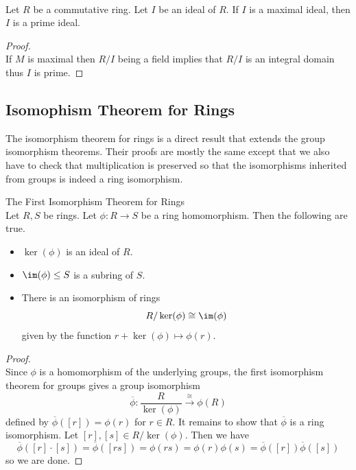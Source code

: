 \documentclass[a4paper]{article}
\begin{document}
\begin{crl}{}{}\\
Let $R$ be a commutative ring. Let $I$ be an ideal of $R$. If $I$ is a maximal ideal, then $I$ is a prime ideal. 
\begin{proof}\\
If $M$ is maximal then $R/I$ being a field implies that $R/I$ is an integral domain thus $I$ is prime. 
\end{proof}
\end{crl}

\subsection{Isomophism Theorem for Rings}
The isomorphism theorem for rings is a direct result that extends the group isomorphism theorems. Their proofs are mostly the same except that we also have to check that multiplication is preserved so that the isomorphisms inherited from groups is indeed a ring isomorphism. 

\begin{thm}{The First Isomorphism Theorem for Rings}{}\\
Let $R,S$ be rings. Let $\phi:R\to S$ be a ring homomorphism. Then the following are true. 
\begin{itemize}
\item $\ker(\phi)$ is an ideal of $R$. 
\item $\im(\phi)\leq S$ is a subring of $S$. 
\item There is an isomorphism of rings $$R/\ker(\phi)\cong\im(\phi)$$ given by the function $r+\ker(\phi)\mapsto\phi(r)$. 
\end{itemize}
\begin{proof}\\
Since $\phi$ is a homomorphism of the underlying groups, the first isomorphism theorem for groups gives a group isomorphism $$\overline{\phi}:\frac{R}{\ker(\phi)}\overset{\cong}{\to}\phi(R)$$ defined by $\overline{\phi}([r])=\phi(r)$ for $r\in R$. It remains to show that $\overline{\phi}$ is a ring isomorphism. Let $[r],[s]\in R/\ker(\phi)$. Then we have $$\overline{\phi}([r]\cdot[s])=\overline{\phi}([rs])=\phi(rs)=\phi(r)\phi(s)=\overline{\phi}([r])\overline{\phi}([s])$$ so we are done. 
\end{proof}
\end{thm}
\end{document}

